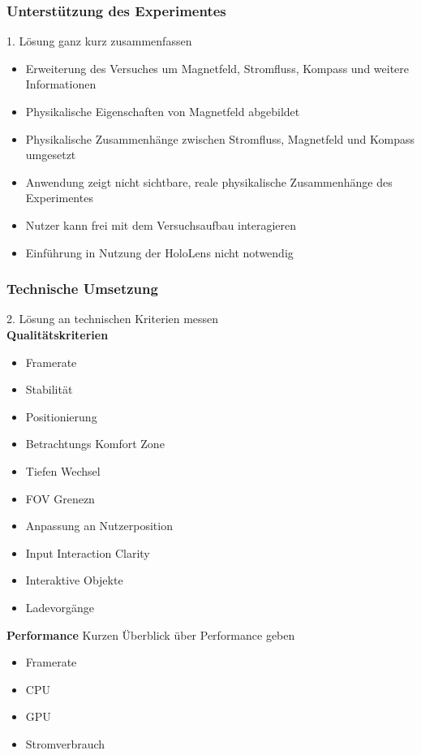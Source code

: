 \subsubsection{Unterstützung des Experimentes}
1. Lösung ganz kurz zusammenfassen\\
\begin{itemize}
	\item Erweiterung des Versuches um Magnetfeld, Stromfluss, Kompass und weitere Informationen
	\item Physikalische Eigenschaften von Magnetfeld abgebildet
	\item Physikalische Zusammenhänge zwischen Stromfluss, Magnetfeld und Kompass umgesetzt
	\item Anwendung zeigt nicht sichtbare, reale physikalische Zusammenhänge des Experimentes
	\item Nutzer kann frei mit dem Versuchsaufbau interagieren
	\item Einführung in Nutzung der HoloLens nicht notwendig
\end{itemize}

\subsubsection{Technische Umsetzung}
2. Lösung an technischen Kriterien messen\\
\textbf{Qualitätskriterien}
\begin{itemize}
	\item Framerate
	\item Stabilität
	\item Positionierung
	\item Betrachtungs Komfort Zone
	\item Tiefen Wechsel
	\item FOV Grenezn
	\item Anpassung an Nutzerposition
	\item Input Interaction Clarity
	\item Interaktive Objekte
	\item Ladevorgänge
\end{itemize}

\textbf{Performance}
Kurzen Überblick über Performance geben
\begin{itemize}
	\item Framerate
	\item CPU
	\item GPU
	\item Stromverbrauch
\end{itemize}


